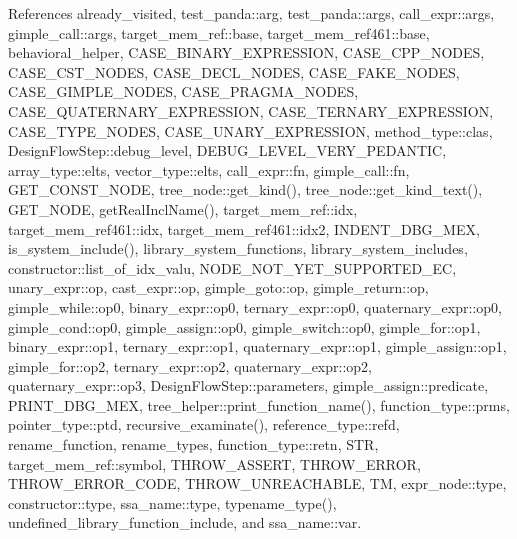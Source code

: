 References already\+\_\+visited, test\+\_\+panda\+::arg, test\+\_\+panda\+::args, call\+\_\+expr\+::args, gimple\+\_\+call\+::args, target\+\_\+mem\+\_\+ref\+::base, target\+\_\+mem\+\_\+ref461\+::base, behavioral\+\_\+helper, C\+A\+S\+E\+\_\+\+B\+I\+N\+A\+R\+Y\+\_\+\+E\+X\+P\+R\+E\+S\+S\+I\+ON, C\+A\+S\+E\+\_\+\+C\+P\+P\+\_\+\+N\+O\+D\+ES, C\+A\+S\+E\+\_\+\+C\+S\+T\+\_\+\+N\+O\+D\+ES, C\+A\+S\+E\+\_\+\+D\+E\+C\+L\+\_\+\+N\+O\+D\+ES, C\+A\+S\+E\+\_\+\+F\+A\+K\+E\+\_\+\+N\+O\+D\+ES, C\+A\+S\+E\+\_\+\+G\+I\+M\+P\+L\+E\+\_\+\+N\+O\+D\+ES, C\+A\+S\+E\+\_\+\+P\+R\+A\+G\+M\+A\+\_\+\+N\+O\+D\+ES, C\+A\+S\+E\+\_\+\+Q\+U\+A\+T\+E\+R\+N\+A\+R\+Y\+\_\+\+E\+X\+P\+R\+E\+S\+S\+I\+ON, C\+A\+S\+E\+\_\+\+T\+E\+R\+N\+A\+R\+Y\+\_\+\+E\+X\+P\+R\+E\+S\+S\+I\+ON, C\+A\+S\+E\+\_\+\+T\+Y\+P\+E\+\_\+\+N\+O\+D\+ES, C\+A\+S\+E\+\_\+\+U\+N\+A\+R\+Y\+\_\+\+E\+X\+P\+R\+E\+S\+S\+I\+ON, method\+\_\+type\+::clas, Design\+Flow\+Step\+::debug\+\_\+level, D\+E\+B\+U\+G\+\_\+\+L\+E\+V\+E\+L\+\_\+\+V\+E\+R\+Y\+\_\+\+P\+E\+D\+A\+N\+T\+IC, array\+\_\+type\+::elts, vector\+\_\+type\+::elts, call\+\_\+expr\+::fn, gimple\+\_\+call\+::fn, G\+E\+T\+\_\+\+C\+O\+N\+S\+T\+\_\+\+N\+O\+DE, tree\+\_\+node\+::get\+\_\+kind(), tree\+\_\+node\+::get\+\_\+kind\+\_\+text(), G\+E\+T\+\_\+\+N\+O\+DE, get\+Real\+Incl\+Name(), target\+\_\+mem\+\_\+ref\+::idx, target\+\_\+mem\+\_\+ref461\+::idx, target\+\_\+mem\+\_\+ref461\+::idx2, I\+N\+D\+E\+N\+T\+\_\+\+D\+B\+G\+\_\+\+M\+EX, is\+\_\+system\+\_\+include(), library\+\_\+system\+\_\+functions, library\+\_\+system\+\_\+includes, constructor\+::list\+\_\+of\+\_\+idx\+\_\+valu, N\+O\+D\+E\+\_\+\+N\+O\+T\+\_\+\+Y\+E\+T\+\_\+\+S\+U\+P\+P\+O\+R\+T\+E\+D\+\_\+\+EC, unary\+\_\+expr\+::op, cast\+\_\+expr\+::op, gimple\+\_\+goto\+::op, gimple\+\_\+return\+::op, gimple\+\_\+while\+::op0, binary\+\_\+expr\+::op0, ternary\+\_\+expr\+::op0, quaternary\+\_\+expr\+::op0, gimple\+\_\+cond\+::op0, gimple\+\_\+assign\+::op0, gimple\+\_\+switch\+::op0, gimple\+\_\+for\+::op1, binary\+\_\+expr\+::op1, ternary\+\_\+expr\+::op1, quaternary\+\_\+expr\+::op1, gimple\+\_\+assign\+::op1, gimple\+\_\+for\+::op2, ternary\+\_\+expr\+::op2, quaternary\+\_\+expr\+::op2, quaternary\+\_\+expr\+::op3, Design\+Flow\+Step\+::parameters, gimple\+\_\+assign\+::predicate, P\+R\+I\+N\+T\+\_\+\+D\+B\+G\+\_\+\+M\+EX, tree\+\_\+helper\+::print\+\_\+function\+\_\+name(), function\+\_\+type\+::prms, pointer\+\_\+type\+::ptd, recursive\+\_\+examinate(), reference\+\_\+type\+::refd, rename\+\_\+function, rename\+\_\+types, function\+\_\+type\+::retn, S\+TR, target\+\_\+mem\+\_\+ref\+::symbol, T\+H\+R\+O\+W\+\_\+\+A\+S\+S\+E\+RT, T\+H\+R\+O\+W\+\_\+\+E\+R\+R\+OR, T\+H\+R\+O\+W\+\_\+\+E\+R\+R\+O\+R\+\_\+\+C\+O\+DE, T\+H\+R\+O\+W\+\_\+\+U\+N\+R\+E\+A\+C\+H\+A\+B\+LE, TM, expr\+\_\+node\+::type, constructor\+::type, ssa\+\_\+name\+::type, typename\+\_\+type(), undefined\+\_\+library\+\_\+function\+\_\+include, and ssa\+\_\+name\+::var.

